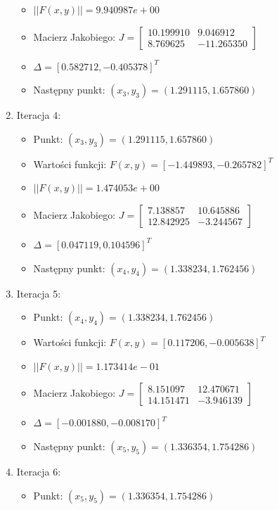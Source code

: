 \documentclass[a4paper,12pt]{article}
\begin{document}
\begin{enumerate}
\begin{itemize}
    \item $||F(x,y)|| = 9.940987e+00$
    \item Macierz Jakobiego: $J = \begin{bmatrix} 10.199910 & 9.046912 \\ 8.769625 & -11.265350 \end{bmatrix}$
    \item $\Delta = [0.582712, -0.405378]^T$
    \item Następny punkt: $(x_3, y_3) = (1.291115, 1.657860)$
  \end{itemize}
\item Iteracja 4:
  \begin{itemize}
    \item Punkt: $(x_3, y_3) = (1.291115, 1.657860)$
    \item Wartości funkcji: $F(x,y) = [-1.449893, -0.265782]^T$
    \item $||F(x,y)|| = 1.474053e+00$
    \item Macierz Jakobiego: $J = \begin{bmatrix} 7.138857 & 10.645886 \\ 12.842925 & -3.244567 \end{bmatrix}$
    \item $\Delta = [0.047119, 0.104596]^T$
    \item Następny punkt: $(x_4, y_4) = (1.338234, 1.762456)$
  \end{itemize}
\item Iteracja 5:
  \begin{itemize}
    \item Punkt: $(x_4, y_4) = (1.338234, 1.762456)$
    \item Wartości funkcji: $F(x,y) = [0.117206, -0.005638]^T$
    \item $||F(x,y)|| = 1.173414e-01$
    \item Macierz Jakobiego: $J = \begin{bmatrix} 8.151097 & 12.470671 \\ 14.151471 & -3.946139 \end{bmatrix}$
    \item $\Delta = [-0.001880, -0.008170]^T$
    \item Następny punkt: $(x_5, y_5) = (1.336354, 1.754286)$
  \end{itemize}
\item Iteracja 6:
  \begin{itemize}
    \item Punkt: $(x_5, y_5) = (1.336354, 1.754286)$

\end{itemize}
\end{enumerate}
\end{document}

